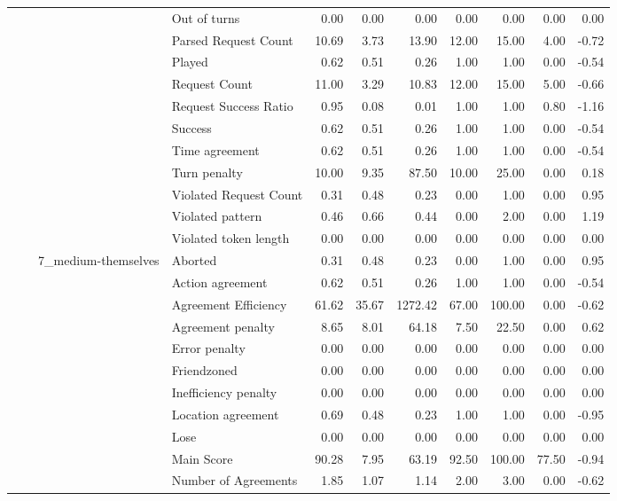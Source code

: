 \begin{tabular}{llllrrrrrrr}
 &  &  & Out of turns & 0.00 & 0.00 & 0.00 & 0.00 & 0.00 & 0.00 & 0.00 \\
 &  &  & Parsed Request Count & 10.69 & 3.73 & 13.90 & 12.00 & 15.00 & 4.00 & -0.72 \\
 &  &  & Played & 0.62 & 0.51 & 0.26 & 1.00 & 1.00 & 0.00 & -0.54 \\
 &  &  & Request Count & 11.00 & 3.29 & 10.83 & 12.00 & 15.00 & 5.00 & -0.66 \\
 &  &  & Request Success Ratio & 0.95 & 0.08 & 0.01 & 1.00 & 1.00 & 0.80 & -1.16 \\
 &  &  & Success & 0.62 & 0.51 & 0.26 & 1.00 & 1.00 & 0.00 & -0.54 \\
 &  &  & Time agreement & 0.62 & 0.51 & 0.26 & 1.00 & 1.00 & 0.00 & -0.54 \\
 &  &  & Turn penalty & 10.00 & 9.35 & 87.50 & 10.00 & 25.00 & 0.00 & 0.18 \\
 &  &  & Violated Request Count & 0.31 & 0.48 & 0.23 & 0.00 & 1.00 & 0.00 & 0.95 \\
 &  &  & Violated pattern & 0.46 & 0.66 & 0.44 & 0.00 & 2.00 & 0.00 & 1.19 \\
 &  &  & Violated token length & 0.00 & 0.00 & 0.00 & 0.00 & 0.00 & 0.00 & 0.00 \\
\cline{3-11}
 &  & \multirow[t]{27}{*}{7_medium-themselves} & Aborted & 0.31 & 0.48 & 0.23 & 0.00 & 1.00 & 0.00 & 0.95 \\
 &  &  & Action agreement & 0.62 & 0.51 & 0.26 & 1.00 & 1.00 & 0.00 & -0.54 \\
 &  &  & Agreement Efficiency & 61.62 & 35.67 & 1272.42 & 67.00 & 100.00 & 0.00 & -0.62 \\
 &  &  & Agreement penalty & 8.65 & 8.01 & 64.18 & 7.50 & 22.50 & 0.00 & 0.62 \\
 &  &  & Error penalty & 0.00 & 0.00 & 0.00 & 0.00 & 0.00 & 0.00 & 0.00 \\
 &  &  & Friendzoned & 0.00 & 0.00 & 0.00 & 0.00 & 0.00 & 0.00 & 0.00 \\
 &  &  & Inefficiency penalty & 0.00 & 0.00 & 0.00 & 0.00 & 0.00 & 0.00 & 0.00 \\
 &  &  & Location agreement & 0.69 & 0.48 & 0.23 & 1.00 & 1.00 & 0.00 & -0.95 \\
 &  &  & Lose & 0.00 & 0.00 & 0.00 & 0.00 & 0.00 & 0.00 & 0.00 \\
 &  &  & Main Score & 90.28 & 7.95 & 63.19 & 92.50 & 100.00 & 77.50 & -0.94 \\
 &  &  & Number of Agreements & 1.85 & 1.07 & 1.14 & 2.00 & 3.00 & 0.00 & -0.62 \\

\end{tabular}
